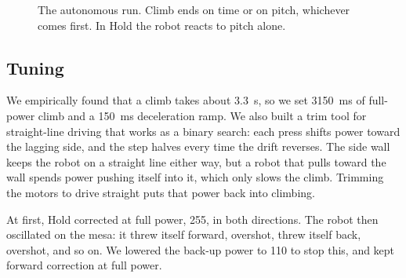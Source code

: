 \begin{figure}[htbp]
  \caption{The autonomous run. Climb ends on time or on pitch, whichever comes first. In Hold the robot reacts to pitch alone.}
  \label{fig:states}
\end{figure}

\subsection{Tuning}
\label{sec:tuning}
We empirically found that a climb takes about \qty{3.3}{s}, so we set \qty{3150}{ms} of full-power climb and a \qty{150}{ms} deceleration ramp. We also built a trim tool for straight-line driving that works as a binary search: each press shifts power toward the lagging side, and the step halves every time the drift reverses. The side wall keeps the robot on a straight line either way, but a robot that pulls toward the wall spends power pushing itself into it, which only slows the climb. Trimming the motors to drive straight puts that power back into climbing.

At first, Hold corrected at full power, 255, in both directions. The robot then oscillated on the mesa: it threw itself forward, overshot, threw itself back, overshot, and so on. We lowered the back-up power to 110 to stop this, and kept forward correction at full power.

